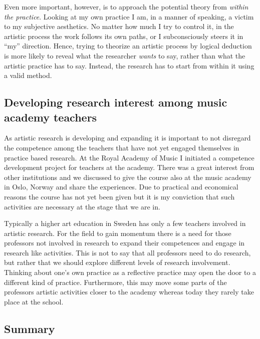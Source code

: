 \documentclass[a4paper]{article}
\begin{document}
Even more important, however, is to approach the potential theory from \emph{within the practice}. Looking at my own practice I am, in a manner of speaking, a victim to my subjective aesthetics. No matter how much I try to control it, in the artistic process the work follows its own paths, or I subconsciously steers it in ``my'' direction\cite[See][for an extended discussion on this topic.]{frisk12-improv}. Hence, trying to theorize an artistic process by logical deduction is more likely to reveal what the researcher \emph{wants} to say, rather than what the artistic practice has to say. Instead, the research has to start from within it using a valid method.

\subsection*{\textsf{Developing research interest among music academy teachers}}
\label{sec:devel-rese-awar}

As artistic research is developing and expanding it is important to not disregard the competence among the teachers that have not yet engaged themselves in practice based research. At the Royal Academy of Music I initiated a competence development project for teachers at the academy. There was a great interest from other institutions and we discussed to give the course also at the music academy in Oslo, Norway and share the experiences. Due to practical and economical reasons the course has not yet been given but it is my conviction that such activities are necessary at the stage that we are in.

Typically a higher art education in Sweden has only a few teachers involved in artistic research. For the field to gain momentum there is a need for those professors not involved in research to expand their competences and engage in research like activities. This is not to say that all professors need to do research, but rather that we should explore different levels of research involvement. Thinking about one's own practice as a reflective practice may open the door to a different kind of practice. Furthermore, this may move some parts of the professors artistic activities closer to the academy whereas today they rarely take place at the school.

\subsection*{\textsf{Summary}}
\label{sec:teaching-experience}
\end{document}
